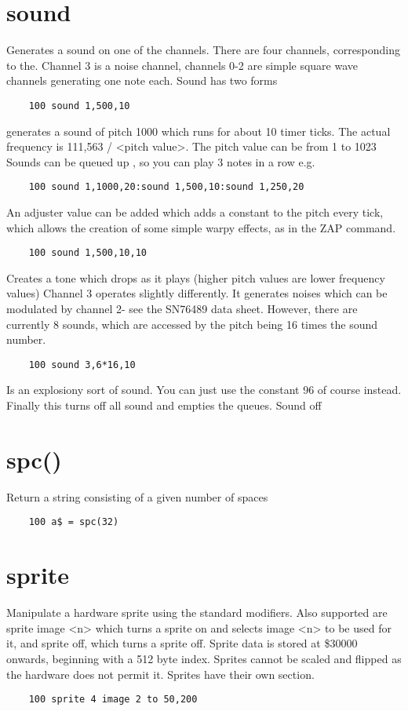 \section*{sound}
Generates a sound on one of the channels. There are four channels, corresponding to the. Channel 3 is a noise channel, channels 0-2 are simple square wave channels generating one note each. 
Sound has two forms
\example{}
\begin{verbatim}
	100 sound 1,500,10
\end{verbatim}
generates a sound of pitch 1000 which runs for about 10 timer ticks. The actual frequency is 111,563 / <pitch value>. The pitch value can be from 1 to 1023
Sounds can be queued up , so you can play 3 notes in a row e.g.
\example{}
\begin{verbatim}
	100 sound 1,1000,20:sound 1,500,10:sound 1,250,20
\end{verbatim}
An adjuster value can be added which adds a constant to the pitch every tick, which allows the creation of some simple warpy effects, as in the ZAP command.
\example{}
\begin{verbatim}
	100 sound 1,500,10,10
\end{verbatim}
Creates a tone which drops as it plays (higher pitch values are lower frequency values)
Channel 3 operates slightly differently. It generates noises which can be modulated by channel 2- see the SN76489 data sheet.
However, there are currently 8 sounds, which are accessed by the pitch being 16 times the sound number.
\example{}
\begin{verbatim}
	100 sound 3,6*16,10
\end{verbatim}
Is an explosiony sort of sound. You can just use the constant 96 of course instead.
Finally this turns off all sound and empties the queues.
Sound off

\section*{spc()}
Return a string consisting of a given number of spaces
\example{}
\begin{verbatim}
	100 a$ = spc(32)
\end{verbatim}

\section*{sprite}
Manipulate a hardware sprite using the standard modifiers. Also supported are sprite image <n> which turns a sprite on and selects image <n> to be used for it, and sprite off, which turns a sprite off. Sprite data is stored at \$30000 onwards, beginning with a 512 byte index. Sprites cannot be scaled and flipped as the hardware does not permit it. Sprites have their own section.
\example{}
\begin{verbatim}
	100 sprite 4 image 2 to 50,200
\end{verbatim}

